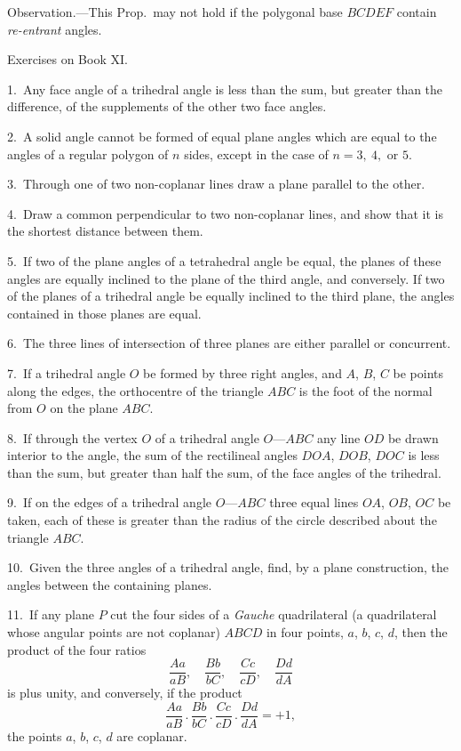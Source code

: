 \documentclass[oneside]{book}
\newcommand\exhead[1]{
\Needspace*{5\baselineskip}\begin{center}
\textsf{#1}
\end{center}
}
\begin{document}
\smallskip
\begin{footnotesize}
\textsf{Observation.}---This Prop.\ may not hold if the polygonal base
$BCDEF$ contain \emph{re-entrant} angles.
\par\end{footnotesize}

\exhead{Exercises on Book XI\@.}

\begin{footnotesize}
1.~Any face angle of a trihedral angle is less than the sum, but
greater than the difference, of the supplements of the other two
face angles.

2.~A solid angle cannot be formed of equal plane angles which
are equal to the angles of a regular polygon of $n$ sides, except in
the case of $n = 3,\ 4, \text{\ or } 5$.

3.~Through one of two non-coplanar lines draw a plane parallel
to the other.

4.~Draw a common perpendicular to two non-coplanar lines,
and show that it is the shortest distance between them.

5.~If two of the plane angles of a tetrahedral angle be equal,
the planes of these angles are equally inclined to the plane of the
third angle, and conversely. If two of the planes of a trihedral
angle be equally inclined to the third plane, the angles contained
in those planes are equal.


6.~The three lines of intersection of three planes are either
parallel or concurrent.

7.~If a trihedral angle $O$ be formed by three right angles, and
$A$, $B$, $C$ be points along the edges, the orthocentre of the triangle
$ABC$ is the foot of the normal from $O$ on the plane $ABC$.

8.~If through the vertex $O$ of a trihedral angle $O$---$ABC$ any
line $OD$ be drawn interior to the angle, the sum of the rectilineal
angles $DOA$, $DOB$, $DOC$ is less than the sum, but greater than
half the sum, of the face angles of the trihedral.

9.~If on the edges of a trihedral angle $O$---$ABC$ three equal
lines $OA$, $OB$, $OC$ be taken, each of these is greater than the
radius of the circle described about the triangle $ABC$.

10.~Given the three angles of a trihedral angle, find, by a plane
construction, the angles between the containing planes.

11.~If any plane $P$ cut the four sides of a \emph{Gauche} quadrilateral
(a quadrilateral whose angular points are not coplanar) $ABCD$ in
four points, $a$, $b$, $c$, $d$, then the product of the four ratios
\[
  \frac{Aa}{aB},\quad
  \frac{Bb}{bC},\quad
  \frac{Cc}{cD},\quad
  \frac{Dd}{dA}
\]
is plus unity, and conversely, if the product
\[
  \frac{Aa}{aB} \,.\,
  \frac{Bb}{bC} \,.\,
  \frac{Cc}{cD} \,.\,
  \frac{Dd}{dA} = +1,
\]
the points $a$, $b$, $c$, $d$ are coplanar.


\end{footnotesize}
\end{document}
